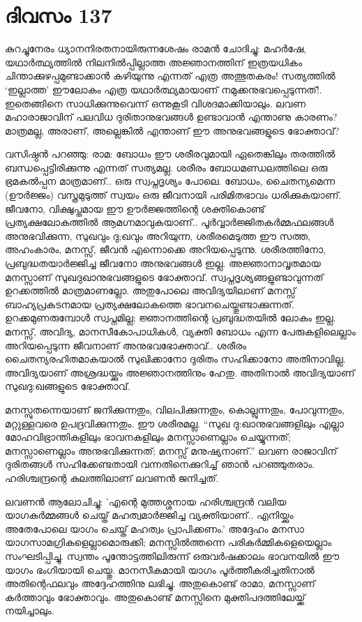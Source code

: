  
\section{ദിവസം 137}


കുറച്ചുനേരം ധ്യാനനിരതനായിരുന്നശേഷം രാമൻ ചോദിച്ചു: മഹർഷേ, യഥാർത്ഥ്യത്തില്‍ നിലനിൽപ്പില്ലാത്ത അജ്ഞാനത്തിന്‌ ഇത്രയധികം ചിന്താക്കുഴപ്പമുണ്ടാക്കാൻ കഴിയുന്നു എന്നത് എത്ര അത്ഭുതകരം! സത്യത്തിൽ ‘ഇല്ലാത്ത’ ഈലോകം എത്ര യഥാർത്ഥ്യമായാണ്‌ നമുക്കനുഭവപ്പെടുന്നത്‌!. ഇതെങ്ങിനെ സാധിക്കുന്നുവെന്ന് ഒന്നുകൂടി വിശദമാക്കിയാലും. ലവണ മഹാരാജാവിന്‌ പലവിധ ദുരിതാനുഭവങ്ങൾ ഉണ്ടാവാൻ എന്താണു കാരണം? മാത്രമല്ല, അരാണ്‌, അല്ലെങ്കിൽ എന്താണ്‌ ഈ അനുഭവങ്ങളുടെ ഭോക്താവ്?

വസിഷ്ഠൻ പറഞ്ഞു: രാമ: ബോധം ഈ ശരീരവുമായി ഏതെങ്കിലും തരത്തിൽ ബന്ധപ്പെട്ടിരിക്കുന്നു എന്നത് സത്യമല്ല. ശരീരം ബോധമണ്ഡലത്തിലെ ഒരു ഭ്രമകൽപ്പന മാത്രമാണ്‌.. ഒരു സ്വപ്നദൃശ്യം പോലെ. ബോധം, ചൈതന്യമെന്ന (ഊര്‍ജ്ജം) വസ്ത്രമുടുത്ത് സ്വയം ഒരു ജീവനായി പരിമിതഭാവം ധരിക്കുകയാണ്‌. ജീവനോ, വിക്ഷുപ്തമായ  ഈ ഊർജ്ജത്തിന്റെ ശക്തികൊണ്ട് പ്രത്യക്ഷലോകത്തിൽ ആമഗ്നമാവുകയാണ്‌.. പൂർവ്വാർജ്ജിതകർമ്മഫലങ്ങൾ അനുഭവിക്കുന്ന, സുഖവും ദു;ഖവും അറിയുന്ന, ശരീരമെടുത്ത ഈ സത്ത, അഹംകാരം, മനസ്സ്, ജീവൻ എന്നൊക്കെ അറിയപ്പെടുന്നു. ശരീരത്തിനോ, പ്രബുദ്ധതയാർജ്ജിച്ച ജീവനോ അനുഭവങ്ങൾ ഇല്ല. അജ്ഞാനാവൃതമായ മനസ്സാണ്‌ സുഖദുഖാനുഭവങ്ങളുടെ ഭോക്താവ്. സ്വപ്നദൃശ്യങ്ങളുണ്ടാവുന്നത് ഉറക്കത്തിൽ മാത്രമാണല്ലോ. അതുപോലെ അവിദ്യയിലാണ്‌ മനസ്സ് ബാഹ്യപ്രകടനമായ പ്രത്യക്ഷലോകത്തെ ഭാവനചെയ്തുണ്ടാക്കുന്നത്. ഉറക്കമുണരുമ്പോൾ സ്വപ്നമില്ല; ജ്ഞാനത്തിന്റെ പ്രബുദ്ധതയിൽ ലോകം ഇല്ല. മനസ്സ്, അവിദ്യ, മാനസീകോപാധികൾ, വ്യക്തി ബോധം എന്ന പേരുകളിലെല്ലാം അറിയപ്പെടുന്ന ജീവനാണ്‌ അനുഭവഭോക്താവ്‌.. ശരീരം ചൈതന്യരഹിതമാകയാൽ സുഖിക്കാനോ ദുരിതം സഹിക്കാനോ അതിനാവില്ല. അവിദ്യയാണ്‌ അശ്രദ്ധയ്ക്കും അജ്ഞാനത്തിനും ഹേതു. അതിനാൽ അവിദ്യയാണ്‌ സുഖദു:ഖങ്ങളുടെ ഭോക്താവ്.

മനസ്സുതന്നെയാണ്‌ ജനിക്കുന്നതും, വിലപിക്കുന്നതും, കൊല്ലുന്നതും, പോവുന്നതും, മറ്റുള്ളവരെ ഉപദ്രവിക്കുന്നതും. ഈ ശരീരമല്ല. “സുഖ ദു:ഖാനുഭവങ്ങളിലും എല്ലാ മോഹവിഭ്രാന്തികളിലും ഭാവനകളിലും മനസ്സാണെല്ലാം ചെയ്യുന്നത്; മനസ്സാണെല്ലാം അനുഭവിക്കുന്നത്; മനസ്സ് മനുഷ്യനാണ്‌.” ലവണ രാജാവിന്‌ ദുരിതങ്ങൾ സഹിക്കേണ്ടതായി വന്നതിനെക്കുറിച്ച് ഞാൻ പറഞ്ഞുതരാം. ഹരിശ്ചന്ദ്രന്റെ കുലത്തിലാണ്‌ ലവണൻ ജനിച്ചത്.

ലവണൻ ആലോചിച്ചു: 'എന്റെ മുത്തശ്ശനായ ഹരിശ്ചന്ദ്രന്‍ വലിയ യാഗകർമ്മങ്ങള്‍  ചെയ്ത്   മഹത്വമാർജ്ജിച്ച വ്യക്തിയാണ്‌.. എനിയ്ക്കും അതേപോലെ  യാഗം ചെയ്ത് മഹത്വം പ്രാപിക്കണം.' അദ്ദേഹം മനസാ  യാഗസാമഗ്രികളെല്ലാമൊരുക്കി; മനസ്സില്‍ത്തന്നെ പരികർമ്മികളെയെല്ലാം സംഘടിപ്പിച്ചു. സ്വന്തം പൂന്തോട്ടത്തിലിരുന്ന് ഒരുവർഷക്കാലം ഭാവനയിൽ ഈ യാഗം ഭംഗിയായി ചെയ്തു. മാനസീകമായി യാഗം പൂർത്തീകരിച്ചതിനാൽ അതിന്റെഫലവും അദ്ദേഹത്തിനു ലഭിച്ചു. അതുകൊണ്ട് രാമാ, മനസ്സാണ്‌ കർത്താവും ഭോക്താവും. അതുകൊണ്ട് മനസ്സിനെ മുക്തിപദത്തിലേയ്ക്ക് നയിച്ചാലും. 

